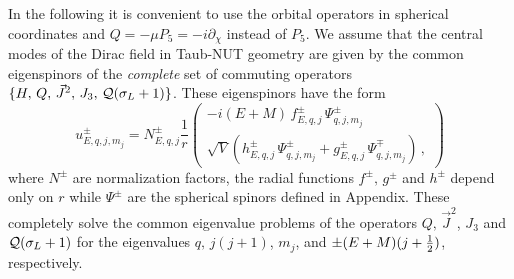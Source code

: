 \documentclass[a4paper,12pt]{article}
\begin{document}
In the following it is convenient to use the orbital operators in spherical 
coordinates \cite{CV} and  $Q=-\mu P_{5}=-i\partial_{\chi}$ instead of $P_{5}$. 
We assume that the central modes of the Dirac field in Taub-NUT geometry are 
given by the common eigenspinors of the {\em complete} set of commuting 
operators 
$\{H,\,Q,\,{\vec{J}}^{2},\,J_{3},\,{\cal Q}(\sigma_{L}+1)\}$.     
These eigenspinors  have the form
\begin{equation}\label{spinor}
u^{\pm}_{E,q,j,m_{j}}
=N^{\pm}_{E,q,j}\frac{1}{r}\left(
\begin{array}{r}
-i(E+M)\,f^{\pm}_{E,q,j}\,\Psi^{\pm}_{q,j,m_{j}}\\
\sqrt{V}(h^{\pm} _{E,q,j}\,\Psi^{\pm}_{q,j,m_{j}}+
g^{\pm} _{E,q,j}\,\Psi^{\mp}_{q,j,m_{j}})\,,
\end{array}\right)
\end{equation}
where $N^{\pm}$ are normalization factors, the radial functions $f^{\pm},\,
g^{\pm}$ and $h^{\pm}$ depend only on $r$ while $\Psi^{\pm}$ are the 
spherical spinors defined in Appendix. These completely solve the common 
eigenvalue problems of the operators 
$Q,\,{\vec{J}}^{2}$,  $J_{3}$ and ${\cal Q}(\sigma_{L}+1)$ for the eigenvalues 
$q,\,j(j+1)$, $m_{j}$, and $\pm(E+M)(j+{1\over 2})$, respectively. 
\end{document}
